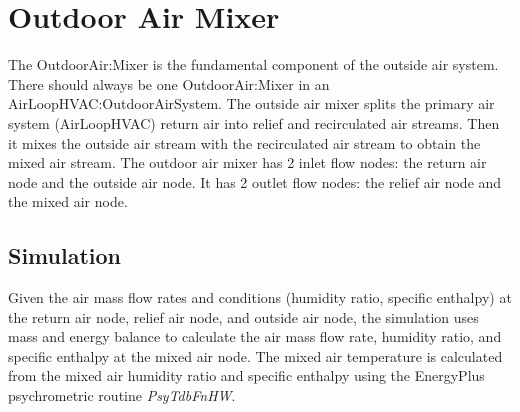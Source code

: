 \section{Outdoor Air Mixer}\label{outdoor-air-mixer}

The OutdoorAir:Mixer is the fundamental component of the outside air system. There should always be one OutdoorAir:Mixer in an AirLoopHVAC:OutdoorAirSystem. The outside air mixer splits the primary air system (AirLoopHVAC) return air into relief and recirculated air streams. Then it mixes the outside air stream with the recirculated air stream to obtain the mixed air stream. The outdoor air mixer has 2 inlet flow nodes: the return air node and the outside air node. It has 2 outlet flow nodes: the relief air node and the mixed air node.

\subsection{Simulation}\label{simulation-001}

Given the air mass flow rates and conditions (humidity ratio, specific enthalpy) at the return air node, relief air node, and outside air node, the simulation uses mass and energy balance to calculate the air mass flow rate, humidity ratio, and specific enthalpy at the mixed air node. The mixed air temperature is calculated from the mixed air humidity ratio and specific enthalpy using the EnergyPlus psychrometric routine \emph{PsyTdbFnHW}.
